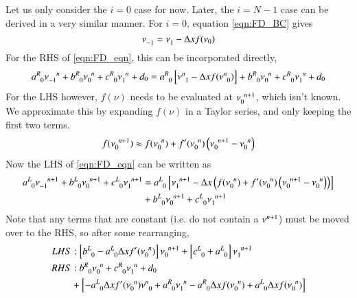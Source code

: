 \documentclass[letterpaper,12pt]{article}
\newcommand \bcf{f}
\begin{document}
Let us only consider the $i=0$ case for now. Later, the $i=N-1$ case can be derived in a very similar manner. For $i=0$, equation \ref{eqn:FD_BC} gives
\begin{equation}
  \nu\indices{_{-1}} = \nu\indices{_{1}} - \Delta x \bcf(\nu_0)
\end{equation}
For the RHS of \ref{eqn:FD_eqn}, this can be incorporated directly,
\begin{equation}
  \label{eqn:lhs}
  a\indices{^R_0} \nu\indices{_{-1}^{n  }}
+ b\indices{^R_0} \nu\indices{_{ 0}^{n  }}
+ c\indices{^R_0} \nu\indices{_{ 1}^{n  }}
+ d_0
=
  a\indices{^R_0} \left[\nu\indices{^{n}_{1}} - \Delta x \bcf(\nu\indices{^{n}_{0}})\right]
+ b\indices{^R_0} \nu\indices{_{ 0}^{n  }}
+ c\indices{^R_0} \nu\indices{_{ 1}^{n  }}
+ d_0
\end{equation}
For the LHS however, $\bcf\left(\nu\right)$ needs to be evaluated at $\nu\indices{_{0}^{n+1}}$, which isn't known. We approximate this by expanding $\bcf\left(\nu\right)$ in a Taylor series, and only keeping the first two terms.
\begin{equation}
  \bcf(\nu\indices{_{0}^{n+1}}) \approx \bcf (\nu\indices{_{0}^{n}})
                                      +  \bcf'(\nu\indices{_{0}^{n}}) \left( \nu\indices{_{0}^{n+1}} - \nu\indices{_{0}^{n}} \right)
\end{equation}
Now the LHS of \ref{eqn:FD_eqn} can be written as
\begin{align}
  \label{eqn:rhs}
  a\indices{^L_0} \nu\indices{_{-1}^{n+1}}
+ b\indices{^L_0} \nu\indices{_{0 }^{n+1}}
+ c\indices{^L_0} \nu\indices{_{ 1}^{n+1}}
&=
a\indices{^L_0} \left[ \nu\indices{_{1}^{n+1}}
                    - \Delta x \left(\bcf (\nu\indices{_{0}^{n}})
                               +     \bcf'(\nu\indices{_{0}^{n}}) \left( \nu\indices{_{0}^{n+1}} - \nu\indices{_{0}^{n}} \right) \right)
               \right] \nonumber \\
&+ b\indices{^L_0} \nu\indices{_{0  }^{n+1}}
 + c\indices{^L_0} \nu\indices{_{  1}^{n+1}}
\end{align}
Note that any terms that are constant (i.e. do not contain a $\nu\indices{^{n+1}}$) must be moved over to the RHS, so after
some rearranging,
\begin{align}
  \label{eqn:minLHS}
  LHS&: 
  \left[b\indices{^L_0} - a\indices{^L_0}\Delta x \bcf'(\nu\indices{_{0}^n}) \right] \nu\indices{_0^{n+1}}
+ \left[c\indices{^L_0} + a\indices{^L_0}                                             \right] \nu\indices{_1^{n+1}} \\
  \label{eqn:minRHS}
  RHS&:
  b\indices{^R_0}\nu\indices{_0^n}
+ c\indices{^R_0}\nu\indices{_1^n}
+ d_0 \nonumber \\
&+
\left[
- a\indices{^L_0} \Delta x \bcf'(\nu\indices{_0^n}) \nu\indices{^n_0}
+ a\indices{^R_0}                 \nu\indices{_1^n} 
- a\indices{^R_0} \Delta x \bcf (\nu\indices{_0^n})
+ a\indices{^L_0} \Delta x \bcf (\nu\indices{_0^n})
\right]
\end{align}
\end{document}
